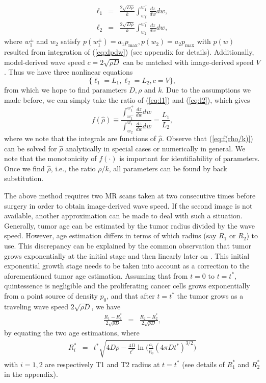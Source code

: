 \documentclass{aims}
\numberwithin{equation}{section}
\begin{document}
\begin{subequations}
\begin{eqnarray}
\ell_{1} & = & \frac{2\sqrt{D\rho}}{k}\int_{w_{1}^{-}}^{w_{1}^{+}}\frac{dz}{dw}dw,\label{eq:l1}\\
\ell_{2} & = & \frac{2\sqrt{D\rho}}{k}\int_{w_{2}}^{w_{1}^{-}}\frac{dz}{dw}dw,\label{eq:l2}
\end{eqnarray}
\end{subequations}
where $w_{1}^{\pm}$ and $w_{2}$ satisfy $p(w_{1}^{\pm})=a_{1}p_{\text{max}},p(w_{2})=a_{2}p_{\max}$ with $p(w)$ resulted from integration of (\ref{eq:dpdw}) (see appendix for details). Additionally, model-derived wave
speed $c=2\sqrt{\rho D}$ can be matched with image-derived speed
$V$. Thus we have three nonlinear equations
\begin{equation}
\{\ell_{1}=L_{1},\ell_{2}=L_{2},c=V\},\label{eq:l1l2c}
\end{equation}
from which we hope to find parameters $D,\rho$ and $k$. Due
to the assumptions we made before, we can simply take the ratio of
(\ref{eq:l1}) and (\ref{eq:l2}), which gives
\begin{equation}
f(\hat{\rho})\equiv\frac{\int_{w_{1}^{-}}^{w_{1}^{+}}\frac{dz}{dw}dw}{\int_{w_{2}}^{w_{1}^{-}}\frac{dz}{dw}dw}=\frac{L_{1}}{L_{2}},\label{eq:f(rho/k)}
\end{equation}
where we note that the integrals are functions of $\hat{\rho}$. Observe that (\ref{eq:f(rho/k)})
can be solved for $\hat{\rho}$ analytically in special cases or numerically
in general. We note that the monotonicity of $f(\cdot)$ is important
for identifiability of parameters. Once we find $\hat{\rho}$, i.e., the ratio $\rho /k$, all parameters can be found by back substitution.

The above method requires two MR scans taken at two consecutive times
before surgery in order to obtain image-derived wave speed. If the
second image is not available, another approximation can be made to
deal with such a situation. Generally, tumor age can be estimated by the
tumor radius divided by the wave speed. However, age estimation differs
in terms of which radius (say $R_{1}$ or $R_{2}$) to use. This discrepancy
can be explained by the common observation that tumor grows exponentially
at the initial stage and then linearly later on \cite{Kuang}. This
initial exponential growth stage needs to be taken into account as
a correction to the aforementioned tumor age estimation. Assuming that from $t=0$ to $t=t^{*}$, quintessence is negligible and the proliferating cancer cells grows exponentially from a point source of density $p_0$, and that after $t=t^*$
the tumor grows as a traveling wave speed $2\sqrt{\rho D}$, we have
\begin{eqnarray} \label{eq:age est}
\frac{R_1-R_1^*}{2\sqrt{\rho D}}& = & \frac{R_{2}-R_2^*}{2\sqrt{\rho D}},
\end{eqnarray} 
by equating the two age estimations, where 
\begin{eqnarray} \label{eq:Rstar}
R^*_{i} & = & t^* \sqrt{4D\rho - \frac{4D}{t^*} \ln\bigg( \frac{a_i}{p_0} ( 4\pi D t^*)^{3/2} \bigg)}
\end{eqnarray}  
with $i=1,2$ are respectively T1 and T2 radius at $t=t^*$ (see details of $R_1^*$ and $R_2^*$ in the appendix). 
\end{document}

